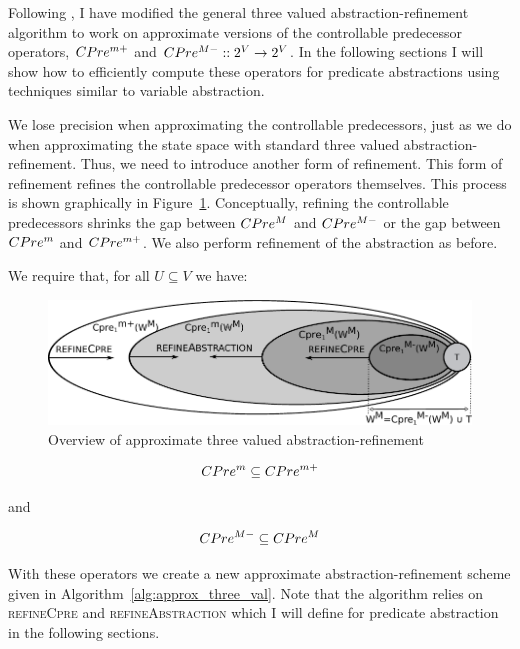 Following \cite{Alfaro_Roy_07}, I have modified the general three valued abstraction-refinement algorithm to work on approximate versions of the controllable predecessor operators, $CPre^{m+}$ and $CPre^{M-} :: 2^V \rightarrow 2^V$. In the following sections I will show how to efficiently compute these operators for predicate abstractions using techniques similar to variable abstraction. 

We lose precision when approximating the controllable predecessors, just as we do when approximating the state space with standard three valued abstraction-refinement. Thus, we need to introduce another form of refinement. This form of refinement refines the controllable predecessor operators themselves. This process is shown graphically in Figure~\ref{fig:approx_three_val_overview}. Conceptually, refining the controllable predecessors shrinks the gap between $CPre^M$ and $CPre^{M-}$ or the gap between $CPre^m$ and $CPre^{m+}$. We also perform refinement of the abstraction as before.

We require that, for all $U \subseteq V$ we have:

\begin{figure}
\centering
\includegraphics[width=0.85\linewidth]{imgs/approxThreeValue.pdf}
\caption{Overview of approximate three valued abstraction-refinement}
\label{fig:approx_three_val_overview}
\end{figure}


\begin{equation}
\label{eqn:cpre_p1}
CPre^m \subseteq CPre^{m+}
\end{equation}

\noindent and

\begin{equation}
\label{eqn:cpre_p2}
CPre^{M-} \subseteq CPre^M
\end{equation}

With these operators we create a new approximate abstraction-refinement scheme given in Algorithm~\ref{alg:approx_three_val}. Note that the algorithm relies on \textsc{refineCpre} and \textsc{refineAbstraction} which I will define for predicate abstraction in the following sections.

